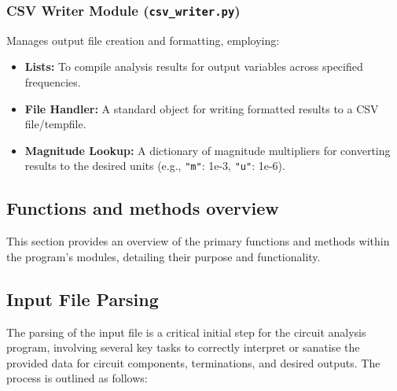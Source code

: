\documentclass[conference]{IEEEtran}
\begin{document}
\subsubsection*{\textbf{CSV Writer Module} (\texttt{csv\_writer.py})}
Manages output file creation and formatting, employing:
\begin{itemize}
    \item \textbf{Lists:} To compile analysis results for output variables across specified frequencies.
    \item \textbf{File Handler:} A standard object for writing formatted results to a CSV file/tempfile.
    \item \textbf{Magnitude Lookup:} A dictionary of magnitude multipliers for converting results to the desired units (e.g., \texttt{"m"}: 1e-3, \texttt{"u"}: 1e-6).
\end{itemize}

\subsection{\textbf{Functions and methods overview}}
This section provides an overview of the primary functions and methods within the program's modules, detailing their purpose and functionality.

\subsection*{\textbf{Input File Parsing}}
The parsing of the input file is a critical initial step for the circuit analysis program,
 involving several key tasks to correctly interpret or sanatise the provided data for circuit components,
  terminations, and desired outputs. The process is outlined as follows:
\end{document}
